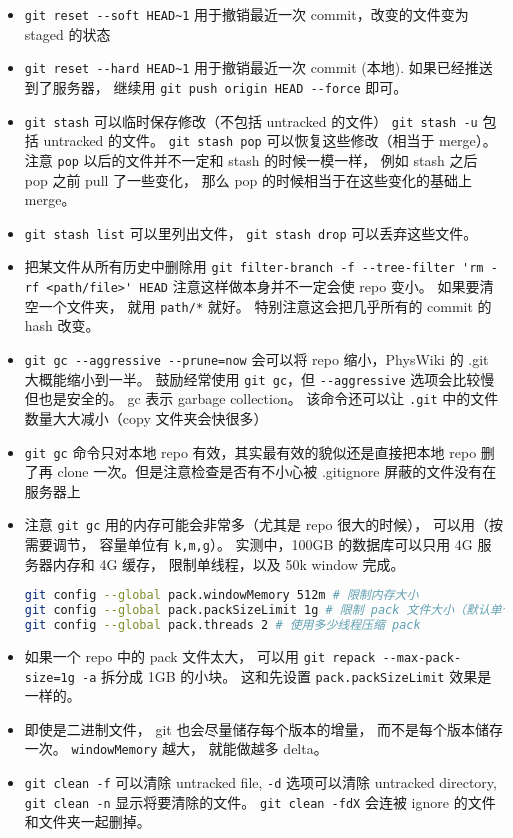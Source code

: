 \begin{itemize}
\item \verb|git reset --soft HEAD~1| 用于撤销最近一次 commit，改变的文件变为 staged 的状态
\item \verb|git reset --hard HEAD~1| 用于撤销最近一次 commit (本地). 如果已经推送到了服务器， 继续用 \verb|git push origin HEAD --force| 即可。
\item \verb|git stash| 可以临时保存修改（不包括 untracked 的文件） \verb|git stash -u| 包括 untracked 的文件。 \verb|git stash pop| 可以恢复这些修改（相当于 merge）。 注意 \verb|pop| 以后的文件并不一定和 stash 的时候一模一样， 例如 stash 之后 pop 之前 pull 了一些变化， 那么 pop 的时候相当于在这些变化的基础上 merge。
\item \verb|git stash list| 可以里列出文件， \verb|git stash drop| 可以丢弃这些文件。
\item 把某文件从所有历史中删除用 \verb|git filter-branch -f --tree-filter 'rm -rf <path/file>' HEAD| 注意这样做本身并不一定会使 repo 变小。 如果要清空一个文件夹， 就用 \verb|path/*| 就好。 特别注意这会把几乎所有的 commit 的 hash 改变。
\item \verb|git gc --aggressive --prune=now| 会可以将 repo 缩小，PhysWiki 的 .git 大概能缩小到一半。 鼓励经常使用 \verb|git gc|，但 \verb|--aggressive| 选项会比较慢但也是安全的。 gc 表示 garbage collection。 该命令还可以让 \verb|.git| 中的文件数量大大减小（copy 文件夹会快很多）
\item \verb|git gc| 命令只对本地 repo 有效，其实最有效的貌似还是直接把本地 repo 删了再 clone 一次。但是注意检查是否有不小心被 .gitignore 屏蔽的文件没有在服务器上
\item 注意 \verb|git gc| 用的内存可能会非常多（尤其是 repo 很大的时候）， 可以用（按需要调节， 容量单位有 \verb|k,m,g|）。 实测中，100GB 的数据库可以只用 4G 服务器内存和 4G 缓存， 限制单线程，以及 50k window 完成。
\begin{lstlisting}[language=bash]
git config --global pack.windowMemory 512m # 限制内存大小
git config --global pack.packSizeLimit 1g # 限制 pack 文件大小（默认单个文件）
git config --global pack.threads 2 # 使用多少线程压缩 pack
\end{lstlisting}
\item 如果一个 repo 中的 pack 文件太大， 可以用 \verb|git repack --max-pack-size=1g -a| 拆分成 1GB 的小块。 这和先设置 \verb|pack.packSizeLimit| 效果是一样的。
\item 即使是二进制文件， git 也会尽量储存每个版本的增量， 而不是每个版本储存一次。 \verb|windowMemory| 越大， 就能做越多 delta。
\item \verb|git clean -f| 可以清除 untracked file, \verb|-d| 选项可以清除 untracked directory,  \verb|git clean -n| 显示将要清除的文件。 \verb|git clean -fdX| 会连被 ignore 的文件和文件夹一起删掉。

\end{itemize}
